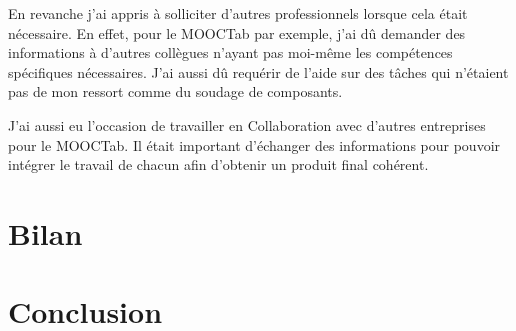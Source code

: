 \documentclass[french,12pt,a4paper,titlepage,openright,openbib]{report}
\begin{document}
En revanche j'ai appris à solliciter d'autres professionnels lorsque cela était nécessaire.
En effet, pour le MOOCTab par exemple, j'ai dû demander des informations à d'autres collègues n'ayant pas moi-même les compétences spécifiques nécessaires.
J'ai aussi dû requérir de l'aide sur des tâches qui n'étaient pas de mon ressort comme du soudage de composants.

J'ai aussi eu l'occasion de travailler en Collaboration avec d'autres entreprises pour le MOOCTab. Il était important d'échanger des informations pour pouvoir intégrer le travail de chacun afin d'obtenir un produit final cohérent.

\chapter{Bilan}
\lipsum[6-7]
\chapter{Conclusion}
\lipsum[8-9]

\printglossary[title={Glossaire}]

{}

	
\end{document}
